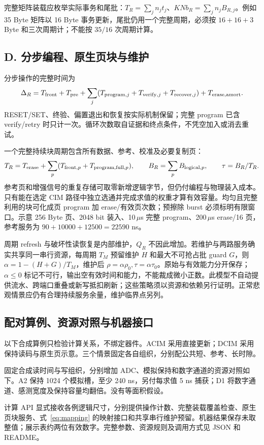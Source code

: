 完整矩阵装载应枚举实际事务和尾批：$T_R=\sum_j n_jt_j$、$KNb_R=\sum_jn_jB_{R,j}$。例如 35 Byte 矩阵以 16 Byte 事务更新，尾批仍用一个完整周期，必须按 $16+16+3$ Byte 和三次周期计；不能按 $35/16$ 次周期计算。

\subsection{D. 分步编程、原生页块与维护}

分步操作的完整时间为
\begin{equation}
\Delta_R=T_{\rm front}+T_{\rm pre}+\sum_j(T_{{\rm program},j}+T_{{\rm verify},j}+T_{{\rm recover},j})+T_{\rm erase,amort}.
\label{eq:program}
\end{equation}
RESET/SET、终验、偏置退出和恢复按实际机制保留；完整 program 已含 verify/retry 时只计一次。循环次数取自证据和终点条件，不凭空加入或消去重试。

一个完整持续块周期包含所有数据、参考、校准及必要复制页：
\begin{equation}
T_R=T_{\rm erase}+\sum_p(T_{{\rm front},p}+T_{{\rm program,full},p}),\qquad
B_R=\sum_pB_{{\rm logical},p},\qquad\tau=B_R/T_R.
\label{eq:page}
\end{equation}
参考页和增强信号的重复存储可取零新增逻辑字节，但仍付编程与物理装入成本。只有能在选定 CIM 路径中独立选通并完成求值的权重才算有效容量。均匀且完整利用的块可化成页 program 加 erase/有效页次数；预擦除 burst 必须标明有限窗口。示意 256 Byte 页、2048 bit 装入、10\,$\mu$s 完整 program、200\,$\mu$s erase/16 页，参考服务为 $90+10000+12500=22590$ ns。

周期 refresh 与破坏性读恢复是内部维护，$Q_R$ 不因此增加。若维护与两路服务确实共享同一串行资源，每周期 $T_M$ 预留维护 $H$ 和最大不可抢占批 guard $G$，则 $\alpha=1-(H+G)/T_M$，维护后 $\rho=\alpha\rho_0,\tau=\alpha\tau_0$。原始与有效能力分开保存；$\alpha\leq0$ 标记不可行，输出空有效时间和能力，不能裁成微小正数。此模型不自动提供流水、跨端口重叠或新写抵扣刷新；这些策略须以资源和依赖另行证明。正常悲观情景应仍有合理持续服务余量，维护临界点另列。

\subsection{配对算例、资源对照与机器接口}

以下合成算例只检验计算关系，不绑定器件。ACIM 采用直接更新；DCIM 采用保持读码与原生页示意。三个情景固定各自组织，分别配公共短、参考、长时隙。


固定合成读时间与写组织，分别增加 ADC、模拟保持和数字通道的资源对照如下。A2 保持 1024 个模拟槽，至少 240 ns，另付每求值 5 ns 捕获；D1 将数字通道、感测宽度及保持容量均翻倍。没有等面积假设。



计算 API 显式接收各例逻辑尺寸，分别提供操作计数、完整装载覆盖检查、原生页块服务、式~\ref{eq:mapping} 的映射接口和共享串行维护预留。机器结果保存未取整值；展示表约两位有效数字。完整参数、资源规则及调用方式见 JSON 和 README。

